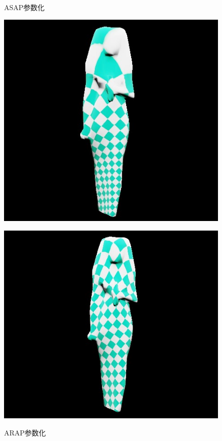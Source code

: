 \documentclass{article}
\begin{document}
\begin{figure}[htbp]
\begin{minipage}{0.24\linewidth}
			\label{chutian2}%
		\end{minipage}
		\begin{minipage}{0.24\linewidth}
			\centering
			\caption{ASAP参数化}
			\includegraphics[width=1\linewidth]{lsis_asap_tex.JPG}
			\label{chutian2}%
		\end{minipage}
		\begin{minipage}{0.24\linewidth}
			\centering
			\caption{ARAP参数化}
			\includegraphics[width=1\linewidth]{lsis_arap_tex.JPG}
			\label{chutian2}%
		\end{minipage}
	\end{figure}
	\clearpage
\end{document}
